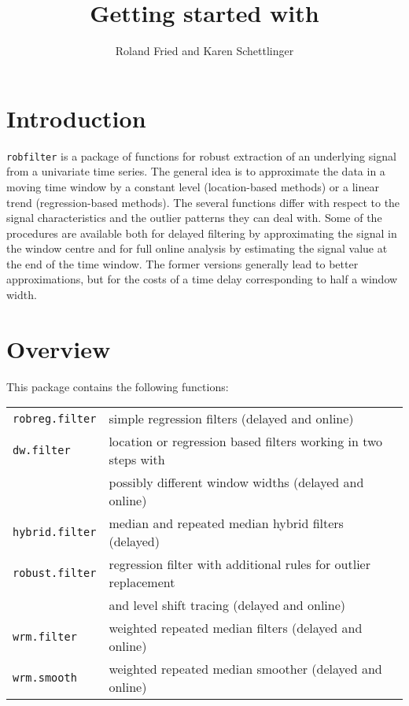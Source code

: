\documentclass[a4paper]{scrartcl}
\title{Getting started with \robfilter}
\author{Roland Fried and Karen Schettlinger}
\date{}
\newcommand*{\robfilter}{\texttt{robfilter} }
\begin{document}
\maketitle

\section{Introduction}

\robfilter is a package of functions for robust extraction of an underlying signal from a univariate time series.
The general idea is to approximate the data in a moving time
window by a constant level (location-based methods) or a linear
trend (regression-based methods). The several functions differ
with respect to the signal characteristics and the outlier
patterns they can deal with. Some of the procedures are available
both for delayed filtering by approximating the signal in the
window centre and for full online analysis by estimating the
signal value at the end of the time window. The former versions
generally lead to better approximations, but for the costs of a
time delay corresponding to half a window width.

\section{Overview}

This package contains the following functions:\\
\begin{tabular}{ll}
\texttt{robreg.filter} & simple regression filters (delayed and online) \\
\texttt{dw.filter}     & location or regression based filters working in two steps with \\
                       & possibly different window widths (delayed and online)\\
\texttt{hybrid.filter} & median and repeated median hybrid filters (delayed)\\
\texttt{robust.filter} & regression filter with additional rules for outlier replacement \\
                       & and level shift tracing (delayed and online)\\
\texttt{wrm.filter}    & weighted repeated median filters (delayed and online)\\
\texttt{wrm.smooth}    & weighted repeated median smoother (delayed and online)
\end{tabular}
\end{document}
